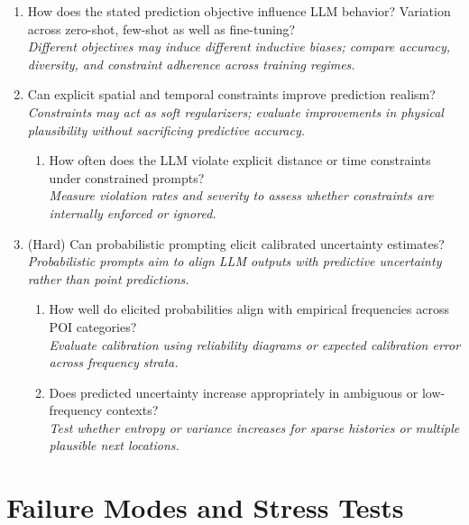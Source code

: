 \documentclass{article}
\begin{document}
\begin{enumerate}
    \item How does the stated prediction objective influence LLM behavior?
    Variation across zero-shot, few-shot as well as fine-tuning?\\
    \textit{Different objectives may induce different inductive biases; compare accuracy, diversity, and constraint adherence across training regimes.}

    \item Can explicit spatial and temporal constraints improve prediction realism?\\
    \textit{Constraints may act as soft regularizers; evaluate improvements in physical plausibility without sacrificing predictive accuracy.}
    \begin{enumerate}
        \item How often does the LLM violate explicit distance or time constraints under constrained prompts?\\
        \textit{Measure violation rates and severity to assess whether constraints are internally enforced or ignored.}
    \end{enumerate}


    \item ({\color{blue}Hard}) Can probabilistic prompting elicit calibrated uncertainty estimates?\\
    \textit{Probabilistic prompts aim to align LLM outputs with predictive uncertainty rather than point predictions.}
    \begin{enumerate}
        \item How well do elicited probabilities align with empirical frequencies across POI categories?\\
        \textit{Evaluate calibration using reliability diagrams or expected calibration error across frequency strata.}
        \item Does predicted uncertainty increase appropriately in ambiguous or low-frequency contexts?\\
        \textit{Test whether entropy or variance increases for sparse histories or multiple plausible next locations.}
    \end{enumerate}
\end{enumerate}

\section{Failure Modes and Stress Tests}
\end{document}
